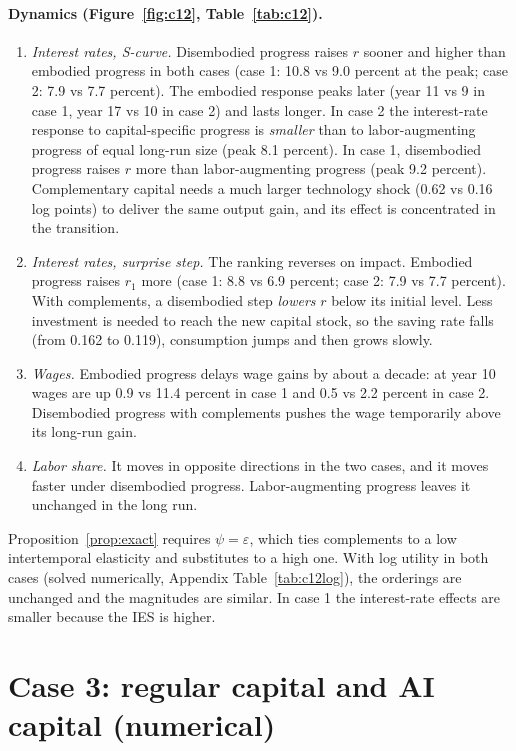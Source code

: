 \documentclass[11pt]{article}
\newcommand{\e}{\varepsilon}
\begin{document}
\paragraph{Dynamics (Figure~\ref{fig:c12}, Table~\ref{tab:c12}).}
\begin{enumerate}
\item \emph{Interest rates, S-curve.} Disembodied progress raises $r$ sooner and
higher than embodied progress in both cases (case 1: 10.8 vs 9.0 percent at the peak;
case 2: 7.9 vs 7.7 percent). The embodied response peaks later (year 11 vs 9 in case 1,
year 17 vs 10 in case 2) and lasts longer. In case 2 the interest-rate response to
capital-specific progress is \emph{smaller} than to labor-augmenting progress of equal
long-run size (peak 8.1 percent). In case 1, disembodied progress raises $r$ more than
labor-augmenting progress (peak 9.2 percent). Complementary capital needs a much larger
technology shock (0.62 vs 0.16 log points) to deliver the same output gain, and its
effect is concentrated in the transition.
\item \emph{Interest rates, surprise step.} The ranking reverses on impact.
Embodied progress raises $r_1$ more (case 1: 8.8 vs 6.9 percent; case 2: 7.9 vs 7.7
percent). With complements, a disembodied step \emph{lowers} $r$ below its initial level.
Less investment is needed to reach the new capital stock, so the saving rate falls
(from 0.162 to 0.119), consumption jumps and then grows slowly.
\item \emph{Wages.} Embodied progress delays wage gains by about a decade: at year 10
wages are up 0.9 vs 11.4 percent in case 1 and 0.5 vs 2.2 percent in case 2.
Disembodied progress with complements pushes the wage temporarily above its long-run gain.
\item \emph{Labor share.} It moves in opposite directions in the two cases, and it moves
faster under disembodied progress. Labor-augmenting progress leaves it unchanged in the
long run.
\end{enumerate}
Proposition~\ref{prop:exact} requires $\psi=\e$, which ties complements to a low
intertemporal elasticity and substitutes to a high one. With log utility in both cases
(solved numerically, Appendix Table~\ref{tab:c12log}), the orderings are unchanged and
the magnitudes are similar. In case 1 the interest-rate effects are smaller because the
IES is higher.

\section{Case 3: regular capital and AI capital (numerical)}
\end{document}
